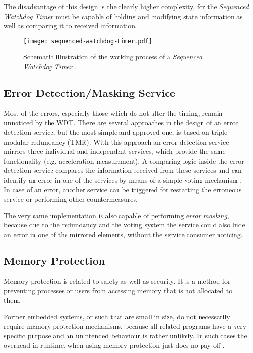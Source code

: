 \begin{description}
The disadvantage of this design is the clearly higher complexity, for the \emph{Sequenced Watchdog Timer} must be capable of holding and modifying state information as well as comparing it to received information.

\begin{figure}[!htbp]
\centering
\texttt{[image: sequenced-watchdog-timer.pdf]}
\caption{Schematic illustration of the working process of a \emph{Sequenced Watchdog Timer} \cite{elattar2007}.}
\label{fig:sequenced-watchdog-timer}
\end{figure}

\end{description}






\subsection{Error Detection/Masking Service}
\label{sec:error-detection-service}

Most of the errors, especially those which do not alter the timing, remain unnoticed by the WDT. There are several approaches in the design of an error detection service, but the most simple and approved one, is based on triple modular redundancy (TMR). With this approach an error detection service mirrors three individual and independent services, which provide the same functionality (e.g. acceleration measurement). A comparing logic inside the error detection service compares the information received from these services and can identify an error in one of the services by means of a simple voting mechanism \cite{wiki_tmr}. In case of an error, another service can be triggered for restarting the erroneous service or performing other countermeasures.

The very same implementation is also capable of performing \emph{error masking}, because due to the redundancy and the voting system the service could also hide an error in one of the mirrored elements, without the service consumer noticing.


\subsection{Memory Protection}
Memory protection is related to safety as well as security. It is a method for preventing processes or users from accessing memory that is not allocated to them.

Former embedded systems, or such that are small in size, do not necessarily require memory protection mechanisms, because all related programs have a very specific purpose and an unintended behaviour is rather unlikely. In such cases the overhead in runtime, when using memory protection just does no pay off \cite{yamada2008}. 

